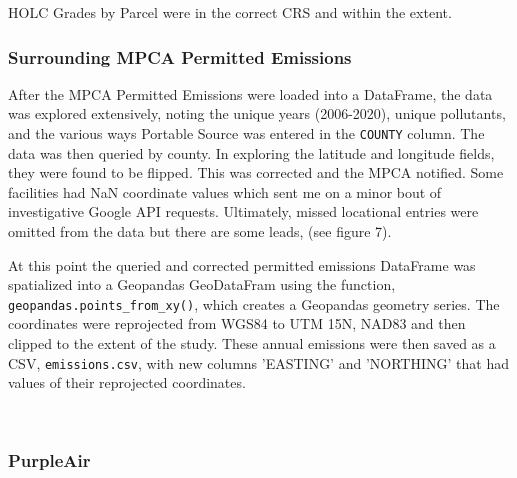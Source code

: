\documentclass[article,12pt]{article}
\numberwithin{equation}{section}
\begin{document}
HOLC Grades by Parcel were in the correct CRS and within the extent.

\subsubsection{Surrounding MPCA Permitted Emissions}

After the MPCA Permitted Emissions were loaded into a DataFrame, the data was explored extensively, noting the unique years (2006-2020), unique pollutants, and the various ways Portable Source was entered in the \texttt{COUNTY} column. The data was then queried by county. In exploring the latitude and longitude fields, they were found to be flipped. This was corrected and the MPCA notified. Some facilities had NaN coordinate values which sent me on a minor bout of investigative Google API requests. Ultimately, missed locational entries were omitted from the data but there are some leads, (see figure 7).

At this point the queried and corrected permitted emissions DataFrame was spatialized into a Geopandas GeoDataFram using the function, \texttt{geopandas.points\_from\_xy()}, which creates a Geopandas geometry series. The coordinates were reprojected from WGS84 to UTM 15N, NAD83 and then clipped to the extent of the study. These annual emissions were then saved as a CSV, \texttt{emissions.csv}, with new columns 'EASTING' and 'NORTHING' that had values of their reprojected coordinates. \nopagebreak
	\begin{center}
		\\
		
	\end{center}

\subsubsection{PurpleAir}
\end{document}
